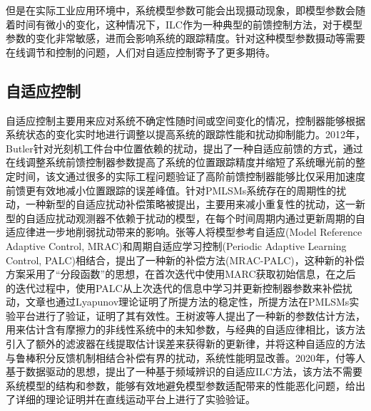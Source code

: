 但是在实际工业应用环境中，系统模型参数可能会出现摄动现象，即模型参数会随着时间有微小的变化，这种情况下，ILC作为一种典型的前馈控制方法，对于模型参数的变化非常敏感，进而会影响系统的跟踪精度。针对这种模型参数摄动等需要在线调节和控制的问题，人们对自适应控制寄予了更多期待。
\subsection{自适应控制}
自适应控制主要用来应对系统不确定性随时间或空间变化的情况，控制器能够根据系统状态的变化实时地进行调整以提高系统的跟踪性能和扰动抑制能力。2012年，Butler\cite{butler2012adaptive}针对光刻机工件台中位置依赖的扰动，提出了一种自适应前馈的方式，通过在线调整系统前馈控制器参数提高了系统的位置跟踪精度并缩短了系统曝光前的整定时间，该文通过很多的实际工程问题验证了高阶前馈控制器能够比仅采用加速度前馈更有效地减小位置跟踪的误差峰值。针对PMLSMs系统存在的周期性的扰动，一种新型的自适应扰动补偿策略被提出\cite{cho2014high}，主要用来减小重复性的扰动，这一新型的自适应扰动观测器不依赖于扰动的模型，在每个时间周期内通过更新周期的自适应律进一步地削弱扰动带来的影响。张等人\cite{zhang2019force}将模型参考自适应(Model Reference Adaptive Control, MRAC)和周期自适应学习控制(Periodic Adaptive Learning Control, PALC)相结合，提出了一种新的补偿方法(MRAC-PALC)，这种新的补偿方案采用了“分段函数”的思想，在首次迭代中使用MARC获取初始信息，在之后的迭代过程中，使用PALC从上次迭代的信息中学习并更新控制器参数来补偿扰动，文章也通过Lyapunov理论证明了所提方法的稳定性，所提方法在PMLSMs实验平台进行了验证，证明了其有效性。王树波等人\cite{wang2020parameter}提出了一种新的参数估计方法，用来估计含有摩擦力的非线性系统中的未知参数，与经典的自适应律相比，该方法引入了额外的滤波器在线提取估计误差来获得新的更新律，并将这种自适应的方法与鲁棒积分反馈机制相结合补偿有界的扰动，系统性能明显改善。2020年，付等人\cite{fu2020frequency}基于数据驱动的思想，提出了一种基于频域辨识的自适应ILC方法，该方法不需要系统模型的结构和参数，能够有效地避免模型参数适配带来的性能恶化问题，给出了详细的理论证明并在直线运动平台上进行了实验验证。

